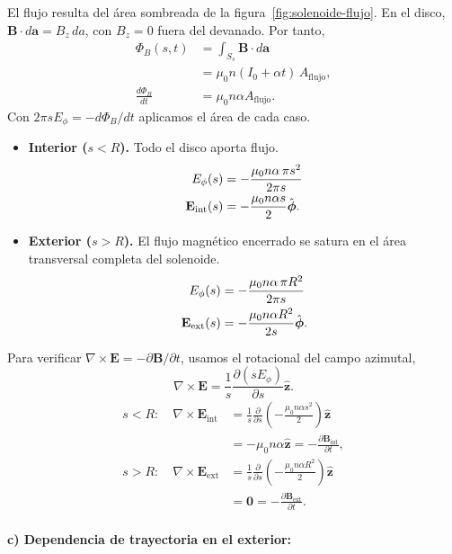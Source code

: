 \documentclass[11pt]{article}
\begin{document}
El flujo resulta del área sombreada de la figura~\ref{fig:solenoide-flujo}.
En el disco, $\mathbf B\cdot d\mathbf a=B_z\,da$, con $B_z=0$
fuera del devanado. Por tanto,
\begin{align*}
    \Phi_B(s,t)
    &=\int_{S_s}\mathbf B\cdot d\mathbf a\\
    &=\mu_0 n(I_0+\alpha t)\,A_{\mathrm{flujo}},\\
    \frac{d\Phi_B}{dt}
    &=\mu_0 n\alpha A_{\mathrm{flujo}}.
\end{align*}
Con $2\pi sE_\phi=-d\Phi_B/dt$ aplicamos el área de cada caso.
\begin{itemize}
    \item \textbf{Interior ($s<R$).} Todo el disco aporta flujo.
    \begin{align}
        E_\phi(s)
        &=-\frac{\mu_0 n\alpha\,\pi s^2}{2\pi s}
          \notag\\
        \mathbf E_{\mathrm{int}}(s)
        &=-\frac{\mu_0 n\alpha s}{2}\hat{\boldsymbol\phi}.
    \end{align}
    \item \textbf{Exterior ($s>R$).} El flujo magnético encerrado se
    satura en el área transversal completa del solenoide.
    \begin{align}
        E_\phi(s)
        &=-\frac{\mu_0 n\alpha\,\pi R^2}{2\pi s}
          \notag\\
        \mathbf E_{\mathrm{ext}}(s)
        &=-\frac{\mu_0 n\alpha R^2}{2s}\hat{\boldsymbol\phi}.
    \end{align}
\end{itemize}
Para verificar $\nabla\times\mathbf E=-\partial\mathbf B/\partial t$,
usamos el rotacional del campo azimutal,
\[
    \nabla\times\mathbf E
    =\frac{1}{s}\frac{\partial(sE_\phi)}{\partial s}\hat{\mathbf z}.
\]
\begin{align*}
    s<R:\quad
    \nabla\times\mathbf E_{\mathrm{int}}
    &=\frac{1}{s}\frac{\partial}{\partial s}
      \left(-\frac{\mu_0 n\alpha s^2}{2}\right)\hat{\mathbf z}\\
    &=-\mu_0 n\alpha\hat{\mathbf z}
      =-\frac{\partial\mathbf B_{\mathrm{int}}}{\partial t},\\[3pt]
    s>R:\quad
    \nabla\times\mathbf E_{\mathrm{ext}}
    &=\frac{1}{s}\frac{\partial}{\partial s}
      \left(-\frac{\mu_0 n\alpha R^2}{2}\right)\hat{\mathbf z}\\
    &=\mathbf 0=-\frac{\partial\mathbf B_{\mathrm{ext}}}{\partial t}.
\end{align*}
\paragraph{c) Dependencia de trayectoria en el exterior:}
\end{document}
